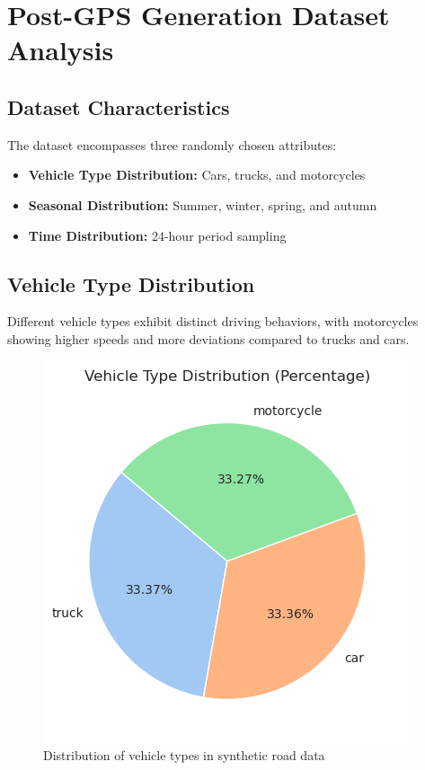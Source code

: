 \documentclass[sigplan,screen]{acmart}
\begin{document}
\section{Post-GPS Generation Dataset Analysis}

\subsection{Dataset Characteristics}
The dataset encompasses three randomly chosen attributes:
\begin{itemize}
    \item \textbf{Vehicle Type Distribution:} Cars, trucks, and motorcycles
    \item \textbf{Seasonal Distribution:} Summer, winter, spring, and autumn
    \item \textbf{Time Distribution:} 24-hour period sampling
\end{itemize}

\subsection{Vehicle Type Distribution}
Different vehicle types exhibit distinct driving behaviors, with motorcycles showing higher speeds and more deviations compared to trucks and cars.

\begin{figure}[h]
    \centering
    \includegraphics[width=0.8\linewidth]{images/vehicle_dist.png}
    \caption{Distribution of vehicle types in synthetic road data}
    \label{fig:vehicle_dist}
\end{figure}
\end{document}
